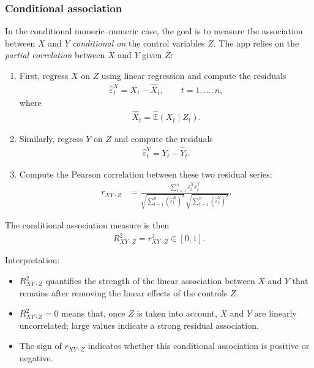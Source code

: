 \documentclass[11pt,a4paper]{article}
\begin{document}
\subsubsection*{Conditional association}

In the conditional numeric--numeric case, the goal is to measure the association between $X$ and $Y$ \emph{conditional on} the control variables $Z$. The app relies on the \emph{partial correlation} between $X$ and $Y$ given $Z$:
\begin{enumerate}
\item First, regress $X$ on $Z$ using linear regression and compute the residuals
\begin{align}
\hat{\varepsilon}^X_t = X_t - \hat{X}_t,
\qquad
t = 1,\dots,n,
\end{align}
where
\begin{align}
\hat{X}_t = \widehat{\mathbb{E}}(X_t \mid Z_t).
\end{align}

\item Similarly, regress $Y$ on $Z$ and compute the residuals
\begin{align}
\hat{\varepsilon}^Y_t = Y_t - \hat{Y}_t.
\end{align}

\item Compute the Pearson correlation between these two residual series:
\begin{align}
r_{XY\cdot Z}
&=
\frac{
\sum_{t=1}^n \hat{\varepsilon}^X_t \hat{\varepsilon}^Y_t
}{
\sqrt{\sum_{t=1}^n (\hat{\varepsilon}^X_t)^2}
\,
\sqrt{\sum_{t=1}^n (\hat{\varepsilon}^Y_t)^2}
}.
\end{align}
\end{enumerate}

The conditional association measure is then
\begin{align}
R^2_{XY\cdot Z} = r_{XY\cdot Z}^2 \in [0,1].
\end{align}

Interpretation:
\begin{itemize}
\item $R^2_{XY\cdot Z}$ quantifies the strength of the linear association between $X$ and $Y$ that remains after removing the linear effects of the controls $Z$.
\item $R^2_{XY\cdot Z} = 0$ means that, once $Z$ is taken into account, $X$ and $Y$ are linearly uncorrelated; large values indicate a strong residual association.
\item The sign of $r_{XY\cdot Z}$ indicates whether this conditional association is positive or negative.
\end{itemize}
\end{document}
